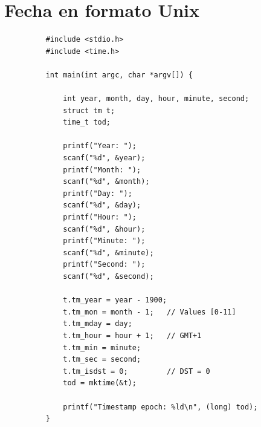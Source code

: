 \documentclass{article}
\begin{document}
\section{Fecha en formato Unix}
    \begin{figure}[H]
    \centering
        \begin{verbatim}
    #include <stdio.h>
    #include <time.h>
    
    int main(int argc, char *argv[]) {
    
    	int year, month, day, hour, minute, second;
    	struct tm t;
    	time_t tod;
    
    	printf("Year: ");
    	scanf("%d", &year);
    	printf("Month: ");
    	scanf("%d", &month);
    	printf("Day: ");
    	scanf("%d", &day);
    	printf("Hour: ");
    	scanf("%d", &hour);
    	printf("Minute: ");
    	scanf("%d", &minute);
    	printf("Second: ");
    	scanf("%d", &second);
    
    	t.tm_year = year - 1900;
    	t.tm_mon = month - 1;   // Values [0-11]
    	t.tm_mday = day;
    	t.tm_hour = hour + 1;   // GMT+1
    	t.tm_min = minute;
    	t.tm_sec = second;
    	t.tm_isdst = 0;         // DST = 0
    	tod = mktime(&t);
    
    	printf("Timestamp epoch: %ld\n", (long) tod);
    }
        \end{verbatim}
    \end{figure}
\end{document}
